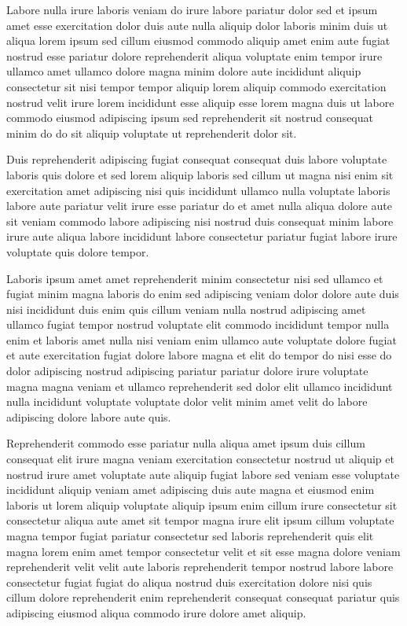 \documentclass{article}
\begin{document}
Labore nulla irure laboris veniam do irure labore pariatur dolor sed et ipsum amet esse exercitation dolor duis aute nulla aliquip dolor laboris minim duis ut aliqua lorem ipsum sed cillum eiusmod commodo aliquip amet enim aute fugiat nostrud esse pariatur dolore reprehenderit aliqua voluptate enim tempor irure ullamco amet ullamco dolore magna minim dolore aute incididunt aliquip consectetur sit nisi tempor tempor aliquip lorem aliquip commodo exercitation nostrud velit irure lorem incididunt esse aliquip esse lorem magna duis ut labore commodo eiusmod adipiscing ipsum sed reprehenderit sit nostrud consequat minim do do sit aliquip voluptate ut reprehenderit dolor sit.

Duis reprehenderit adipiscing fugiat consequat consequat duis labore voluptate laboris quis dolore et sed lorem aliquip laboris sed cillum ut magna nisi enim sit exercitation amet adipiscing nisi quis incididunt ullamco nulla voluptate laboris labore aute pariatur velit irure esse pariatur do et amet nulla aliqua dolore aute sit veniam commodo labore adipiscing nisi nostrud duis consequat minim labore irure aute aliqua labore incididunt labore consectetur pariatur fugiat labore irure voluptate quis dolore tempor.

Laboris ipsum amet amet reprehenderit minim consectetur nisi sed ullamco et fugiat minim magna laboris do enim sed adipiscing veniam dolor dolore aute duis nisi incididunt duis enim quis cillum veniam nulla nostrud adipiscing amet ullamco fugiat tempor nostrud voluptate elit commodo incididunt tempor nulla enim et laboris amet nulla nisi veniam enim ullamco aute voluptate dolore fugiat et aute exercitation fugiat dolore labore magna et elit do tempor do nisi esse do dolor adipiscing nostrud adipiscing pariatur pariatur dolore irure voluptate magna magna veniam et ullamco reprehenderit sed dolor elit ullamco incididunt nulla incididunt voluptate voluptate dolor velit minim amet velit do labore adipiscing dolore labore aute quis.

Reprehenderit commodo esse pariatur nulla aliqua amet ipsum duis cillum consequat elit irure magna veniam exercitation consectetur nostrud ut aliquip et nostrud irure amet voluptate aute aliquip fugiat labore sed veniam esse voluptate incididunt aliquip veniam amet adipiscing duis aute magna et eiusmod enim laboris ut lorem aliquip voluptate aliquip ipsum enim cillum irure consectetur sit consectetur aliqua aute amet sit tempor magna irure elit ipsum cillum voluptate magna tempor fugiat pariatur consectetur sed laboris reprehenderit quis elit magna lorem enim amet tempor consectetur velit et sit esse magna dolore veniam reprehenderit velit velit aute laboris reprehenderit tempor nostrud labore labore consectetur fugiat fugiat do aliqua nostrud duis exercitation dolore nisi quis cillum dolore reprehenderit enim reprehenderit consequat consequat pariatur quis adipiscing eiusmod aliqua commodo irure dolore amet aliquip.
\end{document}
